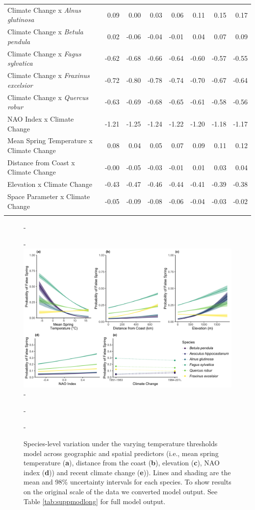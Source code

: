 \documentclass{article}\usepackage[]{graphicx}\usepackage[]{color}
\begin{document}
\begin{longtable}{lrrrrrrr}
  Climate Change
x\textit{ Alnus glutinosa} & 0.09 & 0.00 & 0.03 & 0.06 & 0.11 & 0.15 & 0.17 \\ 
  Climate Change
x\textit{ Betula pendula} & 0.02 & -0.06 & -0.04 & -0.01 & 0.04 & 0.07 & 0.09 \\ 
  Climate Change
x\textit{ Fagus sylvatica} & -0.62 & -0.68 & -0.66 & -0.64 & -0.60 & -0.57 & -0.55 \\ 
  Climate Change
x\textit{ Fraxinus excelsior} & -0.72 & -0.80 & -0.78 & -0.74 & -0.70 & -0.67 & -0.64 \\ 
  Climate Change
x\textit{ Quercus robur} & -0.63 & -0.69 & -0.68 & -0.65 & -0.61 & -0.58 & -0.56 \\ 
  NAO Index x Climate Change & -1.21 & -1.25 & -1.24 & -1.22 & -1.20 & -1.18 & -1.17 \\ 
  Mean Spring 
Temperature x Climate Change & 0.08 & 0.04 & 0.05 & 0.07 & 0.09 & 0.11 & 0.12 \\ 
  Distance from 
Coast x Climate Change & -0.00 & -0.05 & -0.03 & -0.01 & 0.01 & 0.03 & 0.04 \\ 
  Elevation x Climate Change & -0.43 & -0.47 & -0.46 & -0.44 & -0.41 & -0.39 & -0.38 \\ 
  Space Parameter x Climate Change & -0.05 & -0.09 & -0.08 & -0.06 & -0.04 & -0.03 & -0.02 \\ 
   \hline
\hline
\label{tab:suppmodlongtemps}
\end{longtable}


{\begin{figure} [H]
  -\begin{center}
  -\includegraphics[width=12cm]{..//..//analyses/figures/InteractionPlots/Species_longtemps.png}
  -\caption{Species-level variation under the varying temperature thresholds model across geographic and spatial predictors (i.e., mean spring temperature (\textbf{a}), distance from the coast (\textbf{b}), elevation (\textbf{c}), NAO index (\textbf{d})) and recent climate change (\textbf{e})). Lines and shading are the mean and 98\% uncertainty intervals for each species. To show results on the original scale of the data we converted model output. See Table \ref{tab:suppmodlong} for full model output. }\label{fig:spptemps}
  -\end{center}
  -\end{figure}}
\end{document}
